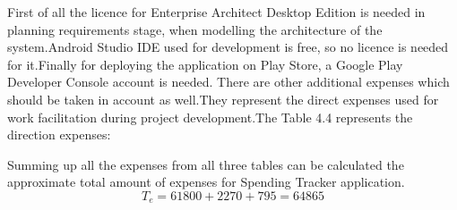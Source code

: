First of all the licence for Enterprise Architect Desktop Edition is needed in planning requirements stage, when modelling the architecture of the system.Android Studio IDE used for development is free, so no licence is needed for it.Finally for deploying the application on Play Store, a Google Play Developer Console account is needed.
There are other additional expenses which should be taken in account as well.They represent the direct expenses used for work facilitation during project development.The Table 4.4 represents the direction expenses:
\begin{table}[H]
	\centering
	\caption{Direct expenses}
	\label{my-label}
\end{table}
Summing up all the expenses from all three tables can be calculated the approximate total amount of expenses for Spending Tracker application.
\[T_{e} = 61800 + 2270 + 795 = 64865\]
